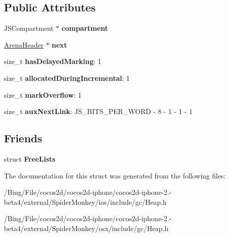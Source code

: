 \subsection*{Public Attributes}
\begin{DoxyCompactItemize}
\item 
\hypertarget{structjs_1_1gc_1_1_arena_header_a0ed1b4cb65b8ec8faa47f38a04a8d67b}{J\-S\-Compartment $\ast$ {\bfseries compartment}}\label{structjs_1_1gc_1_1_arena_header_a0ed1b4cb65b8ec8faa47f38a04a8d67b}

\item 
\hypertarget{structjs_1_1gc_1_1_arena_header_a1c806eea07e5f3bafb16dededb302d7a}{\hyperlink{structjs_1_1gc_1_1_arena_header}{Arena\-Header} $\ast$ {\bfseries next}}\label{structjs_1_1gc_1_1_arena_header_a1c806eea07e5f3bafb16dededb302d7a}

\item 
\hypertarget{structjs_1_1gc_1_1_arena_header_a5f6e92065f4f10f460cb07df3d26ca74}{size\-\_\-t {\bfseries has\-Delayed\-Marking}\-: 1}\label{structjs_1_1gc_1_1_arena_header_a5f6e92065f4f10f460cb07df3d26ca74}

\item 
\hypertarget{structjs_1_1gc_1_1_arena_header_a15496d362e9b256734f52b14997bf4d6}{size\-\_\-t {\bfseries allocated\-During\-Incremental}\-: 1}\label{structjs_1_1gc_1_1_arena_header_a15496d362e9b256734f52b14997bf4d6}

\item 
\hypertarget{structjs_1_1gc_1_1_arena_header_a4044235e0654b060a0fe87caf9fbeaf7}{size\-\_\-t {\bfseries mark\-Overflow}\-: 1}\label{structjs_1_1gc_1_1_arena_header_a4044235e0654b060a0fe87caf9fbeaf7}

\item 
\hypertarget{structjs_1_1gc_1_1_arena_header_af6730cdaf0643d90333c8f0030b87a5c}{size\-\_\-t {\bfseries aux\-Next\-Link}\-: J\-S\-\_\-\-B\-I\-T\-S\-\_\-\-P\-E\-R\-\_\-\-W\-O\-R\-D -\/ 8 -\/ 1 -\/ 1 -\/ 1}\label{structjs_1_1gc_1_1_arena_header_af6730cdaf0643d90333c8f0030b87a5c}

\end{DoxyCompactItemize}
\subsection*{Friends}
\begin{DoxyCompactItemize}
\item 
\hypertarget{structjs_1_1gc_1_1_arena_header_a8e8d583a2860feafb3075169d9d3ddd8}{struct {\bfseries Free\-Lists}}\label{structjs_1_1gc_1_1_arena_header_a8e8d583a2860feafb3075169d9d3ddd8}

\end{DoxyCompactItemize}


The documentation for this struct was generated from the following files\-:\begin{DoxyCompactItemize}
\item 
/\-Bing/\-File/cocos2d/cocos2d-\/iphone/cocos2d-\/iphone-\/2.-\/beta4/external/\-Spider\-Monkey/ios/include/gc/Heap.\-h\item 
/\-Bing/\-File/cocos2d/cocos2d-\/iphone/cocos2d-\/iphone-\/2.-\/beta4/external/\-Spider\-Monkey/osx/include/gc/Heap.\-h\end{DoxyCompactItemize}
